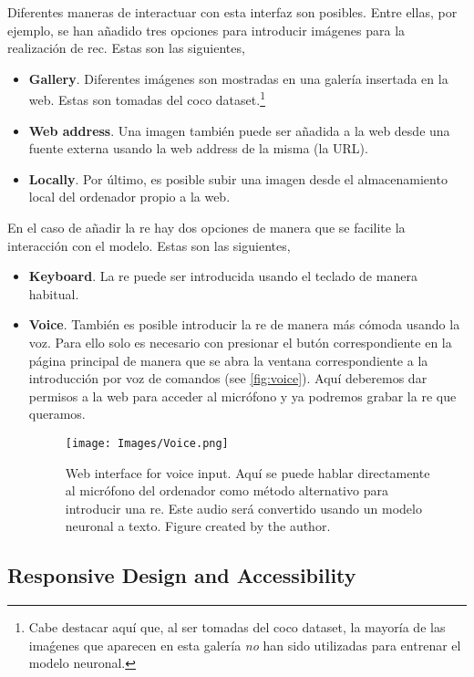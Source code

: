 Diferentes maneras de interactuar con esta interfaz son posibles. Entre ellas,
por ejemplo, se han añadido tres opciones para introducir imágenes para la
realización de \gls{rec}. Estas son las siguientes,
\begin{itemize}
  \item \textbf{Gallery}. Diferentes imágenes son mostradas en una galería
  insertada en la web. Estas son tomadas del \gls{coco} dataset.\footnote{Cabe
    destacar aquí que, al ser tomadas del \gls{coco} dataset, la mayoría de las
    imaǵenes que aparecen en esta galería \emph{no} han sido utilizadas para
    entrenar el modelo neuronal.}
  \item \textbf{Web address}. Una imagen también puede ser añadida a la web
  desde una fuente externa usando la web address de la misma (la URL).
  \item \textbf{Locally}. Por último, es posible subir una imagen desde el
  almacenamiento local del ordenador propio a la web.
\end{itemize}

En el caso de añadir la \gls{re} hay dos opciones de manera que se facilite la
interacción con el modelo. Estas son las siguientes,
\begin{itemize}
  \item \textbf{Keyboard}. La \gls{re} puede ser introducida usando el teclado
  de manera habitual.
  \item \textbf{Voice}. También es posible introducir la \gls{re} de manera más
  cómoda usando la voz. Para ello solo es necesario con presionar el butón
  correspondiente en la página principal de manera que se abra la ventana
  correspondiente a la introducción por voz de comandos (see
  \vref{fig:voice}). Aquí deberemos dar permisos a la web para acceder al
  micrófono y ya podremos grabar la \gls{re} que queramos.
  \begin{figure}[ht]
    \centering
    \texttt{[image: Images/Voice.png]}
    \caption[Web interface for voice input]{Web interface for voice input. Aquí
      se puede hablar directamente al micrófono del ordenador como método
      alternativo para introducir una \gls{re}. Este audio será convertido
      usando un modelo neuronal a texto. Figure created by the
      author.}\label{fig:voice}
  \end{figure}
\end{itemize}

\subsection{Responsive Design and Accessibility}%

